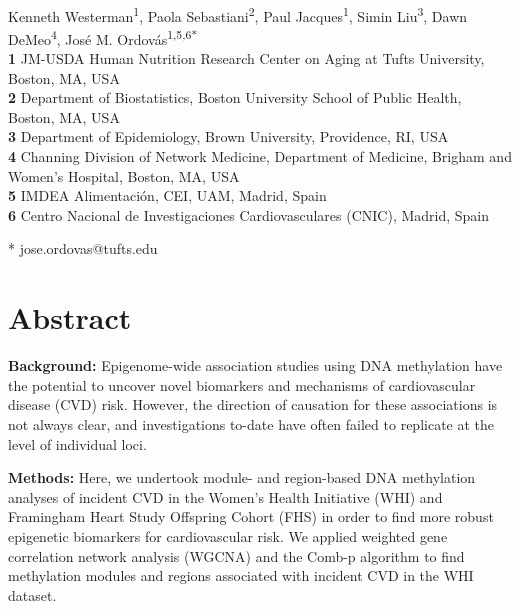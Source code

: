 \documentclass[]{bmcart}
\title{}
\author{}
\date{}
\theoremstyle{definition}
\theoremstyle{definition}
\theoremstyle{definition}
\theoremstyle{remark}
\begin{document}
\begin{flushleft}
{\Large
\textbf{}
}
\newline
\\
Kenneth Westerman\textsuperscript{1},
Paola Sebastiani\textsuperscript{2},
Paul Jacques\textsuperscript{1},
Simin Liu\textsuperscript{3},
Dawn DeMeo\textsuperscript{4},
Jos\'e M. Ordov\'as\textsuperscript{1,5,6*}
\\
\bigskip
\textbf{1} JM-USDA Human Nutrition Research Center on Aging at Tufts University, Boston, MA, USA
\\
\textbf{2} Department of Biostatistics, Boston University School of Public Health, Boston, MA, USA
\\
\textbf{3} Department of Epidemiology, Brown University, Providence, RI, USA
\\
\textbf{4} Channing Division of Network Medicine, Department of Medicine, Brigham and Women's Hospital, Boston, MA, USA
\\
\textbf{5} IMDEA Alimentaci\'on, CEI, UAM, Madrid, Spain
\\
\textbf{6} Centro Nacional de Investigaciones Cardiovasculares (CNIC), Madrid, Spain
\\
\bigskip

* jose.ordovas@tufts.edu

\end{flushleft}

\section{Abstract}\label{abstract}

\textbf{Background:} Epigenome-wide association studies using DNA
methylation have the potential to uncover novel biomarkers and
mechanisms of cardiovascular disease (CVD) risk. However, the direction
of causation for these associations is not always clear, and
investigations to-date have often failed to replicate at the level of
individual loci.

\textbf{Methods:} Here, we undertook module- and region-based DNA
methylation analyses of incident CVD in the Women's Health Initiative
(WHI) and Framingham Heart Study Offspring Cohort (FHS) in order to find
more robust epigenetic biomarkers for cardiovascular risk. We applied
weighted gene correlation network analysis (WGCNA) and the Comb-p
algorithm to find methylation modules and regions associated with
incident CVD in the WHI dataset.
\end{document}

